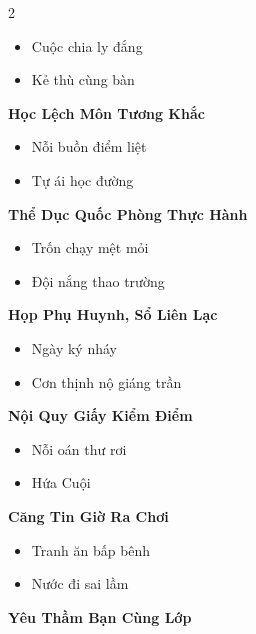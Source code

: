 \begin{multicols}{2}
\begin{itemize}[leftmargin=1.2em, itemsep=0.1em, label=\textcolor{titlecolor}{\tiny$\blacksquare$}]
  \item Cuộc chia ly đắng
  \item Kẻ thù cùng bàn
\end{itemize}
\vspace{0.8em}
\textbf{\color{chapterline}Học Lệch Môn Tương Khắc}
\begin{itemize}[leftmargin=1.2em, itemsep=0.1em, label=\textcolor{titlecolor}{\tiny$\blacksquare$}]
  \item Nỗi buồn điểm liệt
  \item Tự ái học đường
\end{itemize}
\vspace{0.8em}
\textbf{\color{chapterline}Thể Dục Quốc Phòng Thực Hành}
\begin{itemize}[leftmargin=1.2em, itemsep=0.1em, label=\textcolor{titlecolor}{\tiny$\blacksquare$}]
  \item Trốn chạy mệt mỏi
  \item Đội nắng thao trường
\end{itemize}
\vspace{0.8em}
\textbf{\color{chapterline}Họp Phụ Huynh, Sổ Liên Lạc}
\begin{itemize}[leftmargin=1.2em, itemsep=0.1em, label=\textcolor{titlecolor}{\tiny$\blacksquare$}]
  \item Ngày ký nháy
  \item Cơn thịnh nộ giáng trần
\end{itemize}
\vspace{0.8em}
\textbf{\color{chapterline}Nội Quy Giấy Kiểm Điểm}
\begin{itemize}[leftmargin=1.2em, itemsep=0.1em, label=\textcolor{titlecolor}{\tiny$\blacksquare$}]
  \item Nỗi oán thư rơi
  \item Hứa Cuội
\end{itemize}
\vspace{0.8em}
\textbf{\color{chapterline}Căng Tin Giờ Ra Chơi}
\begin{itemize}[leftmargin=1.2em, itemsep=0.1em, label=\textcolor{titlecolor}{\tiny$\blacksquare$}]
  \item Tranh ăn bấp bênh
  \item Nước đi sai lầm
\end{itemize}
\vspace{0.8em}
\textbf{\color{chapterline}Yêu Thầm Bạn Cùng Lớp}
\begin{itemize}[leftmargin=1.2em, itemsep=0.1em, label=\textcolor{titlecolor}{\tiny$\blacksquare$}]

\end{itemize}
\end{multicols}
